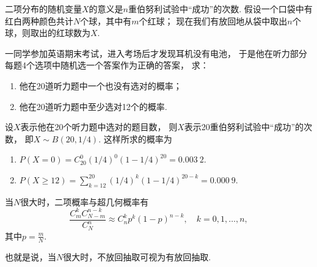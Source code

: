 二项分布的随机变量\(X\)的意义是\(n\)重伯努利试验中“成功”的次数.
假设一个口袋中有红白两种颜色共计\(N\)个球，其中有\(m\)个红球；
现在我们有放回地从袋中取出\(n\)个球，则取出的红球数为\(X\).

\begin{example}
一同学参加英语期末考试，进入考场后才发现耳机没有电池，
于是他在听力部分每题4个选项中随机选一个答案作为正确的答案，
求：\begin{enumerate}
	\item 他在20道听力题中一个也没有选对的概率；
	\item 他在20道听力题中至少选对12个的概率.
\end{enumerate}
\begin{solution}
设\(X\)表示他在20个听力题中选对的题目数，
则\(X\)表示20重伯努利试验中“成功”的次数，
即\(X \sim B(20, 1/4)\).
这样所求的概率为\begin{enumerate}
	\item \(P(X=0) = C_{20}^0 (1/4)^0 (1-1/4)^{20} = 0.003\ 2\).
	\item \(P(X \geq 12) = \sum\limits_{k=12}^{20} (1/4)^k (1-1/4)^{20-k} = 0.000\ 9\).
\end{enumerate}
\end{solution}
\end{example}

\begin{theorem}
当\(N\)很大时，二项概率与超几何概率有\[
	\frac{C_m^k C_{N-m}^{n-k}}{C_N^n} \approx C_n^k p^k (1-p)^{n-k}, \quad k=0,1,\dotsc,n,
\]
其中\(p=\frac{m}{N}\).

也就是说，当\(N\)很大时，不放回抽取可视为有放回抽取.
\end{theorem}

